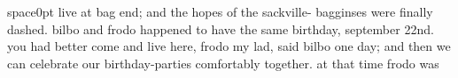 \documentclass[12pt]{report}
\begin{document}
{\begin{minipage}{0.9\textwidth}
space{0pt} live \hspace{0pt} at \hspace{0pt} bag \hspace{0pt} end; \hspace{0pt} and \hspace{0pt} the \hspace{0pt} hopes \hspace{0pt} of \hspace{0pt} the \hspace{0pt} sackville- \hspace{0pt} bagginses \hspace{0pt} were \hspace{0pt} finally \hspace{0pt} dashed. \hspace{0pt} bilbo \hspace{0pt} and \hspace{0pt} frodo \hspace{0pt} happened \hspace{0pt} to \hspace{0pt} have \hspace{0pt} the \hspace{0pt} same \hspace{0pt} birthday, \hspace{0pt} september \hspace{0pt} 22nd. \hspace{0pt} you \hspace{0pt} had \hspace{0pt} better \hspace{0pt} come \hspace{0pt} and \hspace{0pt} live \hspace{0pt} here, \hspace{0pt} frodo \hspace{0pt} my \hspace{0pt} lad, \hspace{0pt} said \hspace{0pt} bilbo \hspace{0pt} one \hspace{0pt} day; \hspace{0pt} and \hspace{0pt} then \hspace{0pt} we \hspace{0pt} can \hspace{0pt} celebrate \hspace{0pt} our \hspace{0pt} birthday-parties \hspace{0pt} comfortably \hspace{0pt} together. \hspace{0pt} at \hspace{0pt} that \hspace{0pt} time \hspace{0pt} frodo \hspace{0pt} was 
\end{minipage}}
\end{document}

